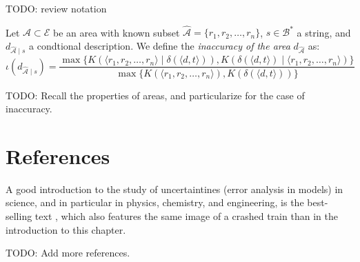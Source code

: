 {\color{red} TODO: review notation}

\begin{definition}
Let $\mathcal{A} \subset \mathcal{E}$ be an area with known subset $\hat{\mathcal{A}} = \{r_1, r_2, \ldots, r_n\}$, $s \in \mathcal{B}^\ast$ a string, and $d_{\hat{\mathcal{A}} \mid s}$ a condtional description. We define the \emph{inaccuracy of the area} $d_{\hat{\mathcal{A}}}$ as:
\[
\iota(d_{\hat{\mathcal{A}} \mid s}) = \frac{ \max\{ K \left( \langle r_1, r_2, \ldots, r_n \rangle \mid \delta(\langle d, t \rangle) \right), K \left( \delta(\langle d, t \rangle) \mid \langle r_1, r_2, \ldots, r_n \rangle \right) \} } { \max\{ K(\langle r_1, r_2, \ldots, r_n \rangle), K \left(\delta(\langle d, t \rangle) \right) \} }
\]
\end{definition}

{\color{red} TODO: Recall the properties of areas, and particularize for the case of inaccuracy.}

%
%

\section*{References}

A good introduction to the study of uncertaintines (error analysis in models) in science, and in particular in physics, chemistry, and engineering, is the best-selling text \cite{taylor2022introduction}, which also features the same image of a crashed train than in the introduction to this chapter.

{\color{red} TODO: Add more references.}

